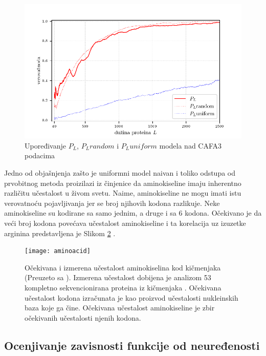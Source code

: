 \begin{figure}[th]
\centering
\includegraphics[]{plots/PL_F_cmp}
\caption{Upoređivanje $P_L$, $P_L random$ i $P_L uniform$ modela nad CAFA3 podacima}
\label{fig:PL2}
\end{figure}


Jedno od objašnjenja zašto je uniformni model naivan i toliko odstupa od
prvobitnog metoda proizilazi iz činjenice da aminokiseline imaju inherentno
različitu učestalost u živom svetu. Naime, aminokiseline ne mogu  imati istu
verovatnoću pojavljivanja jer se  broj njihovih kodona razlikuje. Neke
aminokiseline su kodirane sa samo jednim, a druge i sa 6 kodona. Očekivano je
da veći broj kodona povećava učestalost aminokiseline i ta korelacija uz
izuzetke arginina predstavljena je Slikom \ref{fig:aminoacid}
\parencite{AKfrekvencija}.

\begin{figure}[th]
\centering
\texttt{[image: aminoacid]}
\caption{Očekivana i izmerena učestalost aminokiselina kod kičmenjaka (Preuzeto sa \cite{AA_freq_link}).  \footnotesize
  Izmerena učestalost dobijena je analizom 53 kompletno sekvencionirana proteina iz kičmenjaka \cite{King1969}.
  Očekivana učestalost kodona izračunata je kao proizvod učestalosti nukleinskih baza koje ga čine.
  Očekivana učestalost aminokiseline je zbir očekivanih učestalosti njenih kodona.
}
\label{fig:aminoacid}
\end{figure}




\clearpage
\label{ocenjivanje}
\subsection{Ocenjivanje zavisnosti funkcije od neuređenosti}

